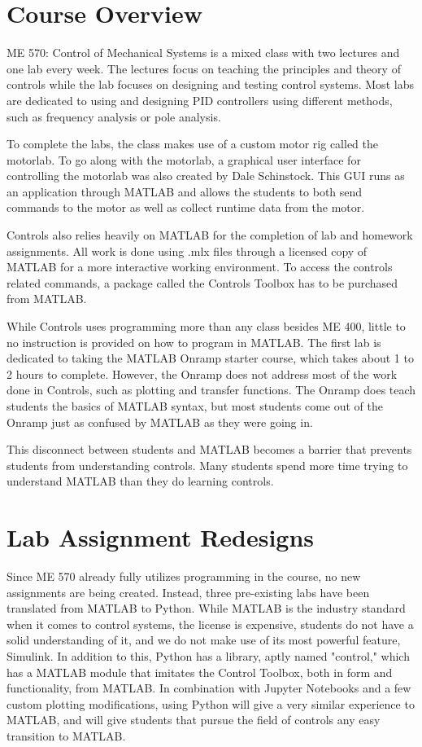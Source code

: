 \section{Course Overview}

ME 570: Control of Mechanical Systems is a mixed class with two lectures and one lab every week. The lectures focus on teaching
the principles and theory of controls while the lab focuses on designing and testing control systems. Most labs are dedicated to
using and designing PID controllers using different methods, such as frequency analysis or pole analysis.

To complete the labs, the class makes use of a custom motor rig called the motorlab. To go along with the motorlab, a graphical 
user interface for controlling the motorlab was also created by Dale Schinstock. This GUI runs as an application through MATLAB 
and allows the students to both send commands to the motor as well as collect runtime data from the motor.

Controls also relies heavily on MATLAB for the completion of lab and homework assignments. All work is done using .mlx files through a 
licensed copy of MATLAB for a more interactive working environment. To access the controls related commands, a package called 
the Controls Toolbox has to be purchased from MATLAB. 

While Controls uses programming more than any class besides ME 400, little to no instruction is provided on how to program in MATLAB.
The first lab is dedicated to taking the MATLAB Onramp starter course, which takes about 1 to 2 hours to complete. However, the 
Onramp does not address most of the work done in Controls, such as plotting and transfer functions. The Onramp does teach students
the basics of MATLAB syntax, but most students come out of the Onramp just as confused by MATLAB as they were going in.

This disconnect between students and MATLAB becomes a barrier that prevents students from understanding controls. Many students
spend more time trying to understand MATLAB than they do learning controls. 

\section{Lab Assignment Redesigns}

Since ME 570 already fully utilizes programming in the course, no new assignments are being created. Instead, three pre-existing
labs have been translated from MATLAB to Python. While MATLAB is the industry standard when it comes to control systems, the
license is expensive, students do not have a solid understanding of it, and we do not make use of its most powerful feature,
Simulink. In addition to this, Python has a library, aptly named "control," which has a MATLAB module that imitates the Control
Toolbox, both in form and functionality, from MATLAB. In combination with Jupyter Notebooks and a few custom plotting modifications,
using Python will give a very similar experience to MATLAB, and will give students that pursue the field of controls any easy
transition to MATLAB. 

